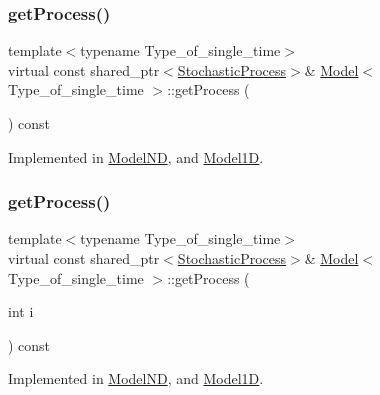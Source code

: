 \subsubsection{\texorpdfstring{get\+Process()}{getProcess()}\hspace{0.1cm}{\footnotesize\ttfamily [1/2]}}
{\footnotesize\ttfamily template$<$typename Type\+\_\+of\+\_\+single\+\_\+time$>$ \\
virtual const shared\+\_\+ptr$<$\hyperlink{class_stochastic_process}{Stochastic\+Process}$>$\& \hyperlink{class_model}{Model}$<$ Type\+\_\+of\+\_\+single\+\_\+time $>$\+::get\+Process (\begin{DoxyParamCaption}{ }\end{DoxyParamCaption}) const\hspace{0.3cm}{\ttfamily [pure virtual]}}



Implemented in \hyperlink{class_model_n_d_ae0965f73049004a6634429b96c9190b8}{Model\+ND}, and \hyperlink{class_model1_d_a670fd7ee0b66d5d865e0d13d6e50bb40}{Model1D}.

\hypertarget{class_model_a7b9e58a51a5d244aa7012f1cdb7aebd8}{}\label{class_model_a7b9e58a51a5d244aa7012f1cdb7aebd8} 
\subsubsection{\texorpdfstring{get\+Process()}{getProcess()}\hspace{0.1cm}{\footnotesize\ttfamily [2/2]}}
{\footnotesize\ttfamily template$<$typename Type\+\_\+of\+\_\+single\+\_\+time$>$ \\
virtual const shared\+\_\+ptr$<$\hyperlink{class_stochastic_process}{Stochastic\+Process}$>$\& \hyperlink{class_model}{Model}$<$ Type\+\_\+of\+\_\+single\+\_\+time $>$\+::get\+Process (\begin{DoxyParamCaption}\item[{int}]{i }\end{DoxyParamCaption}) const\hspace{0.3cm}{\ttfamily [pure virtual]}}



Implemented in \hyperlink{class_model_n_d_acbbc63ae751cb1b3ad6f045fb42b6ac3}{Model\+ND}, and \hyperlink{class_model1_d_af7ff938fd134829e876c41fc8be8c24f}{Model1D}.

\hypertarget{class_model_a19ba3a18a45aad9012dbc6cbafb09e39}{}\label{class_model_a19ba3a18a45aad9012dbc6cbafb09e39} 
